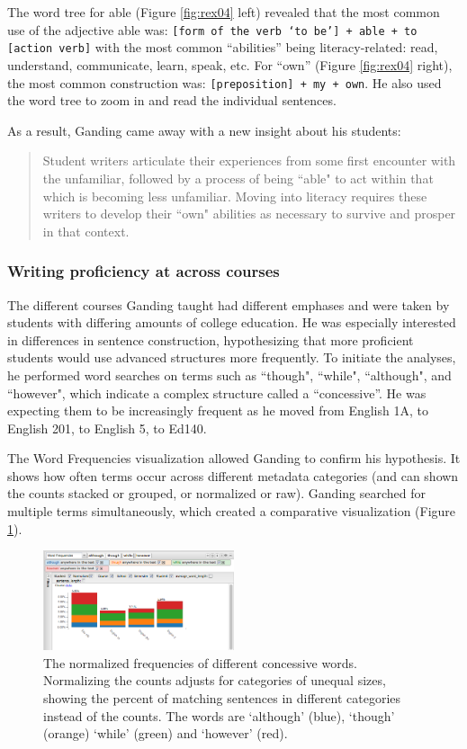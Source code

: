 \documentclass{sig-alternate}
\newcommand{\code}[1] {\texttt{#1}}
\begin{document}
The word tree for able (Figure \ref{fig:rex04} left) revealed that the most common use of the adjective able was: \code{[form of the verb `to be'] + able + to [action verb]} with the most common ``abilities'' being literacy-related: read, understand, communicate, learn, speak, etc.  For ``own'' (Figure \ref{fig:rex04} right), the most common construction was: \code{[preposition] + my + own}.  He also used the word tree to zoom in and read the individual sentences.

As a result, Ganding came away with a new insight about his students:
\begin{quote}
Student writers articulate their experiences from some first encounter with the unfamiliar, followed by a process of being ``able" to act within that which is becoming less unfamiliar.  Moving into literacy requires these writers to develop their ``own" abilities as necessary to survive and prosper in that context.
\end{quote} 

\subsubsection{Writing proficiency at across courses}
The different courses Ganding taught had different emphases and were taken by students with differing amounts of college education. He was especially interested in differences in sentence construction, hypothesizing that more proficient students would use advanced structures more frequently. To initiate the analyses, he performed word searches on terms such as ``though", ``while", ``although", and ``however", which indicate a complex structure called a ``concessive''. He was expecting them to be increasingly frequent as he moved from English 1A, to English 201, to English 5, to Ed140.

The Word Frequencies visualization allowed Ganding to confirm his hypothesis. It shows how often terms occur across different metadata categories (and can shown the counts stacked or grouped, or normalized or raw). Ganding searched for multiple terms simultaneously, which created a comparative visualization (Figure \ref{fig:rex05}).

\begin{figure}[h!]
\includegraphics[width=0.5\textwidth]{fig/rex/05.png}
\caption{The normalized frequencies of different concessive words. Normalizing the counts adjusts for categories of unequal sizes, showing the percent of matching sentences in different categories instead of the counts. The words are `although' (blue), `though' (orange) `while' (green) and `however' (red). \label{fig:rex05}}
\end{figure}
\end{document}
